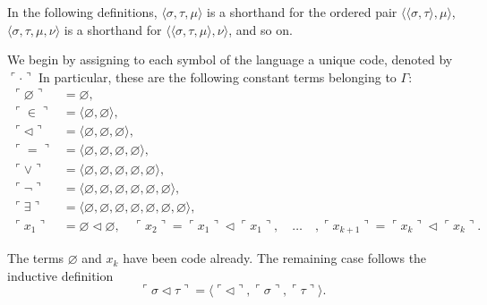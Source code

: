 In the following definitions, $\langle \sigma, \tau, \mu \rangle$ is a shorthand for the ordered
pair $\langle \langle \sigma, \tau \rangle, \mu \rangle$,
$\langle \sigma, \tau, \mu, \nu \rangle$ is a shorthand for 
$\langle \langle \sigma, \tau, \mu \rangle, \nu \rangle$, and so on.

\begin{definition}
    \label{def:Code.Symbol}
    \leanok
    We begin by assigning to each symbol of the language a unique code, denoted by
    $\ulcorner \cdot\urcorner$
    In particular, these are the following constant terms belonging to $\Gamma$:
    $$
    \begin{aligned}
    \ulcorner{\varnothing}\urcorner & =\varnothing, \\
    \ulcorner{\in}\urcorner & =\langle \varnothing,\varnothing\rangle, \\
    \ulcorner{\lhd}\urcorner & =\langle \varnothing,\varnothing,\varnothing\rangle, \\
    \ulcorner{=}\urcorner & =\langle \varnothing,\varnothing,\varnothing,\varnothing\rangle, \\
    \ulcorner{\lor}\urcorner & =
    \langle \varnothing,\varnothing,\varnothing,\varnothing,\varnothing\rangle, \\
    \ulcorner{\neg}\urcorner & =
    \langle \varnothing,\varnothing,\varnothing,\varnothing,\varnothing,\varnothing\rangle, \\
    \ulcorner{\exists}\urcorner & =
    \langle \varnothing,\varnothing,\varnothing,\varnothing,\varnothing,\varnothing,
    \varnothing\rangle,\\
    \ulcorner{x_1}\urcorner & = \varnothing \lhd \varnothing, \quad 
    \ulcorner{x_2}\urcorner = \ulcorner{x_1}\urcorner \lhd \ulcorner{x_1}\urcorner,\quad\ldots\quad,
    \ulcorner{x_{k+1}}\urcorner = \ulcorner{x_k}\urcorner \lhd \ulcorner{x_k}\urcorner.
    \end{aligned}
    $$
\end{definition}

\begin{definition}
    \label{def:Code.Term}
    \leanok
    The terms $\varnothing$ and $x_k$ have been code already. 
    The remaining case follows the inductive definition
    $$
    \ulcorner{\sigma \lhd \tau}\urcorner = 
    \langle\ulcorner{\lhd}\urcorner, \ulcorner{\sigma}\urcorner, \ulcorner{\tau}\urcorner \rangle.
    $$
\end{definition}

